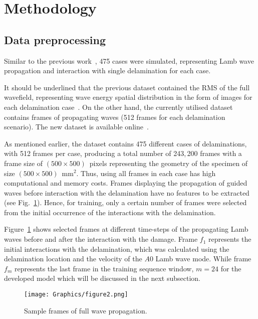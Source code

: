 \documentclass{IOS-Book-Article}
\begin{document}
\section{Methodology}
\begin{sloppypar}
	\subsection{Data preprocessing}
	Similar to the previous work~\cite{Ijjeh2021}, 475 cases were simulated, representing Lamb wave propagation and interaction with single delamination for each case. 
	
	It should be underlined that the previous dataset contained the RMS of the full wavefield, representing wave energy spatial distribution in the form of images for each delamination case~\cite{Kudela2020d}.
	On the other hand, the currently utilised dataset contains frames of propagating waves (512 frames for each delamination scenario).
	The new dataset is available online~\cite{Kudela2021}.
	
	As mentioned earlier, the dataset contains 475 different cases of delaminations, with 512 frames per case, producing a total number of 243,\,200 frames with a frame size of \((500\times500)\)~pixels representing the geometry of the specimen of size \((500\times500)\)~mm\(^{2}\).
	Thus, using all frames in each case has high computational and memory costs.
	Frames displaying the propagation of guided waves before interaction with the delamination have no features to be extracted (see Fig.~\ref{fig:Full_wave}).
	Hence, for training, only a certain number of frames were selected from the initial occurrence of the interactions with the delamination.
	
	Figure~\ref{fig:Full_wave} shows selected frames at different time-steps of the propagating Lamb waves before and after the interaction with the damage.
	Frame \(f_{1}\) represents the initial interactions with the delamination, which was calculated using the delamination location and the velocity of the \(A0\) Lamb wave mode.
	While frame \(f_{m}\) represents the last frame in the training sequence window, \(m=24\) for the developed model which will be discussed in the next subsection.
	\begin{figure}[!h]
		\centering
		\texttt{[image: Graphics/figure2.png]}
		\caption{Sample frames of full wave propagation.}
		\label{fig:Full_wave}
	\end{figure}
	

\end{sloppypar}
\end{document}
